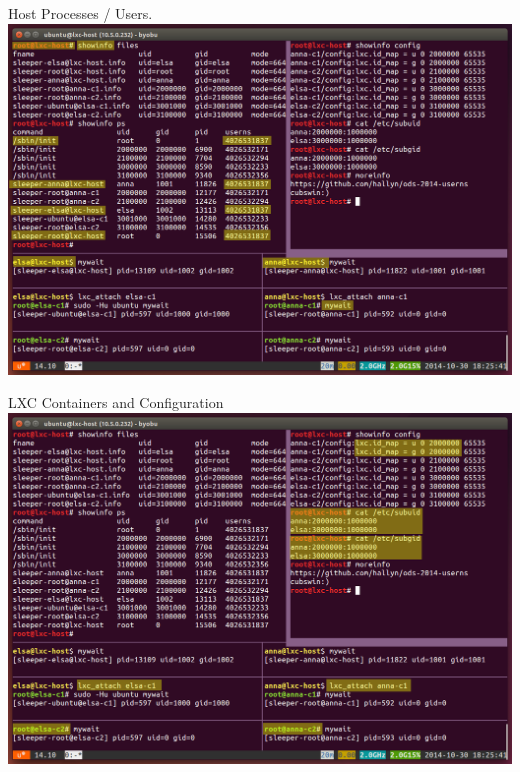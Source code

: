 \documentclass{beamer}
\begin{document}
\begin{frame}
Host Processes / Users.
\includegraphics[width=\textwidth]{screen-host-info.png}
\end{frame}

\begin{frame}
LXC Containers and Configuration
\includegraphics[width=\textwidth]{screen-lxc-config.png}
\end{frame}
\end{document}
